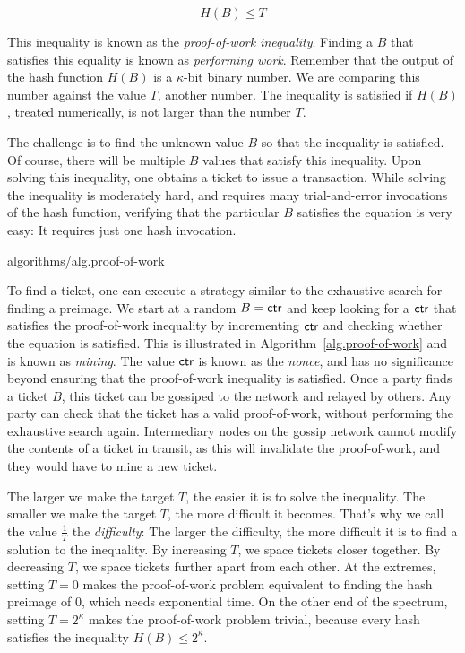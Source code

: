 \[
    H(B) \leq T
\]

This inequality is known as the \emph{proof-of-work inequality}. Finding
a $B$ that satisfies this equality is known as \emph{performing work}.
Remember
that the output of the hash function $H(B)$ is a $\kappa$-bit binary number. We are comparing
this number against the value $T$, another number. The inequality is satisfied if $H(B)$, treated
numerically, is not larger than the number $T$.

The challenge is to find the unknown value $B$ so that the inequality is satisfied. Of course,
there will be multiple $B$ values that satisfy this inequality. Upon solving this inequality,
one obtains a ticket to issue a transaction. While solving the inequality is moderately hard,
and requires many trial-and-error invocations of the hash function, verifying that the particular
$B$ satisfies the equation is very easy: It requires just one hash invocation.

{algorithms/alg.proof-of-work}

To find a ticket, one can execute a strategy similar to the exhaustive search for finding a
preimage. We start at a random $B = \mathsf{ctr}$ and keep looking for a $\mathsf{ctr}$ that satisfies the
proof-of-work inequality by incrementing $\mathsf{ctr}$ and checking whether the equation is satisfied.
This is illustrated in Algorithm~\ref{alg.proof-of-work} and is known
as \emph{mining}. The value $\mathsf{ctr}$ is known as the
\emph{nonce},
and has no significance beyond ensuring that the proof-of-work inequality is satisfied.
Once a party finds a ticket $B$, this ticket can be gossiped
to the network and relayed by others. Any party can check that the ticket has a valid proof-of-work,
without performing the exhaustive search again. Intermediary nodes on the gossip network cannot
modify the contents of a ticket in transit, as this will invalidate the proof-of-work, and they
would have to mine a new ticket.

The larger we make the target $T$, the easier it is to solve the inequality. The smaller we make
the target $T$, the more difficult it becomes. That's why we call the value $\frac{1}{T}$ the
\emph{difficulty}: The larger the difficulty, the more difficult it is to
find a solution to the inequality. By increasing $T$, we space tickets closer together.
By decreasing $T$, we space tickets further apart from each other. At the extremes,
setting $T = 0$ makes the proof-of-work problem equivalent to finding the hash preimage of
$0$, which needs exponential time. On the other end of the spectrum, setting $T = 2^\kappa$
makes the proof-of-work problem trivial, because every hash satisfies the inequality
$H(B) \leq 2^\kappa$.

